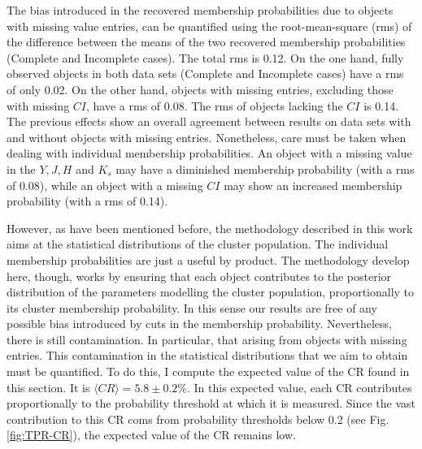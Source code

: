 The bias introduced in the recovered membership probabilities due to objects with missing value entries, can be quantified using the root-mean-square (rms) of the difference between the means of the two recovered membership probabilities (Complete and Incomplete cases). The total rms is 0.12. On the one hand, fully observed objects in both data sets (Complete and Incomplete cases) have a rms of only 0.02. On the other hand, objects with missing entries, excluding those with missing $CI$, have a rms of 0.08. The rms of objects lacking the $CI$ is 0.14. The previous effects show an overall agreement between results on data sets with and without objects with missing entries. Nonetheless, care must be taken when dealing with individual membership probabilities. An object with a missing value in the $Y,J,H$ and $K_s$ may have a diminished membership probability (with a rms of 0.08), while an object with a missing $CI$ may show an increased membership probability (with a rms of 0.14).  


However, as have been mentioned before, the methodology described in this work aims at the statistical distributions of the cluster population. The individual membership probabilities are just a useful by product. The methodology develop here, though, works by ensuring that each object contributes to the posterior distribution of the parameters modelling the cluster population, proportionally to its cluster membership probability. In this sense our results are free of any possible bias introduced by cuts in the membership probability. Nevertheless, there is still contamination. In particular, that arising from objects with missing entries. This contamination in the statistical distributions that we aim to obtain must be quantified. To do this, I compute the expected value of the CR found in this section. It is $\langle CR \rangle=5.8\pm 0.2$\%. In this expected value, each CR contributes proportionally to the probability threshold at which it is measured. Since the vast contribution to this CR coms from probability thresholds below 0.2 (see Fig. \ref{fig:TPR-CR}), the expected value of the CR remains low. 

